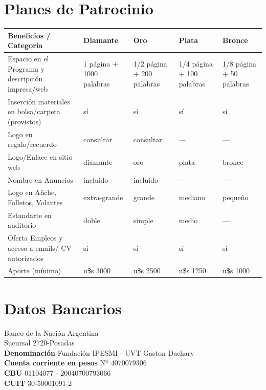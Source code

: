 \documentclass[11pt,a4paper]{report}
\begin{document}
\section*{Planes de Patrocinio}
\begin{center}

\begin{tabular}{|p{4cm}|p{2.5cm}|p{2.5cm}|p{2.5cm}|p{2.5cm}|}
\hline
Beneficios / Categoría & Diamante & Oro  & Plata & Bronce \\
\hline
Espacio en el Programa y descripción impresa/web & 1 página +
1000 palabras & 1/2 página + 200 palabras & 1/4 página + 100 palabras &  1/8 página + 50 palabras\\
\hline
Inserción materiales en bolsa/carpeta (provistos) & sí & sí & sí & sí \\
\hline
Logo en regalo/recuerdo & consultar & consultar & --- & --- \\
\hline
Logo/Enlace en sitio web & diamante & oro & plata & bronce \\
\hline
Nombre en Anuncios & incluido & incluido & --- & --- \\
\hline
Logo en Afiche, Folletos, Volantes & extra-grande & grande & mediano & pequeño \\
\hline
Estandarte en auditorio & doble & simple & medio & --- \\
\hline
Oferta Empleos y acceso a emails/ CV autorizados  & sí & sí & sí & sí \\
\hline
Aporte (mínimo) & u\$s 3000 & u\$s 2500 & u\$s 1250 & u\$s 1000\\
\hline
\end{tabular}
\end{center}

\section*{Datos Bancarios}
\noindent Banco de la Nación Argentina \\
Sucursal 2720-Posadas \\
\textbf{Denominación} Fundación IPESMI - UVT Gaston Dachary \\
\textbf{Cuenta corriente en pesos} Nº 4070079306 \\
\textbf{CBU} 01104077 - 20040700793066 \\
\textbf{CUIT} 30-50001091-2 \\
\end{document}
